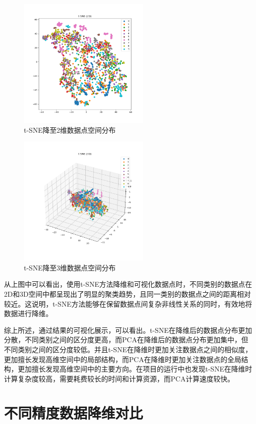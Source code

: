 \documentclass[lettersize,journal]{IEEEtran}
\begin{document}
\begin{figure}[H]
\centering
\includegraphics[width=2.5in]{image/Figure_2.png}
\caption{t-SNE降至2维数据点空间分布}
\end{figure}

\begin{figure}[H]
\centering
\includegraphics[width=2.5in]{image/Figure_4.png}
\caption{t-SNE降至3维数据点空间分布}
\end{figure}

从上图中可以看出，使用t-SNE方法降维和可视化数据点时，不同类别的数据点在2D和3D空间中都呈现出了明显的聚类趋势，且同一类别的数据点之间的距离相对较近。这说明，t-SNE方法能够在保留数据点间复杂非线性关系的同时，有效地将数据进行降维。

综上所述，通过结果的可视化展示，可以看出。t-SNE在降维后的数据点分布更加分散，不同类别之间的区分度更高，而PCA在降维后的数据点分布更加集中，但不同类别之间的区分度较低。并且t-SNE在降维时更加关注数据点之间的相似度，更加擅长发现高维空间中的局部结构，而PCA在降维时更加关注数据点的全局结构，更加擅长发现高维空间中的主要方向。在项目的运行中也发现t-SNE在降维时计算复杂度较高，需要耗费较长的时间和计算资源，而PCA计算速度较快。

\section{不同精度数据降维对比}
\end{document}
